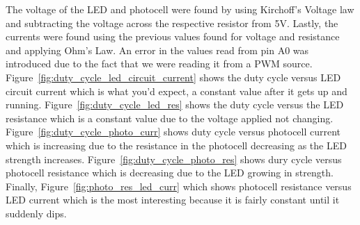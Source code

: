 \documentclass[12pt,titlepage]{article}
\begin{document}
The voltage of the LED and photocell were found by using Kirchoff's Voltage law and subtracting the voltage
across the respective resistor from 5V. Lastly, the currents were found using the previous values found for
voltage and resistance and applying Ohm's Law. An error in the values read from pin A0 was introduced due to
the fact that we were reading it from a PWM source. Figure~\ref{fig:duty_cycle_led_circuit_current} shows the
duty cycle versus LED circuit current which is what you'd expect, a constant value after it gets up and
running. Figure~\ref{fig:duty_cycle_led_res} shows the duty cycle versus the LED resistance which is a
constant value due to the voltage applied not changing. Figure~\ref{fig:duty_cycle_photo_curr}
shows duty cycle versus photocell current which is increasing due to the resistance in the photocell
decreasing as the LED strength increases. Figure~\ref{fig:duty_cycle_photo_res} shows dury cycle versus
photocell resistance which is decreasing due to the LED growing in strength. Finally,
Figure~\ref{fig:photo_res_led_curr} which shows photocell resistance versus LED current which is the most
interesting because it is fairly constant until it suddenly dips.
\end{document}
